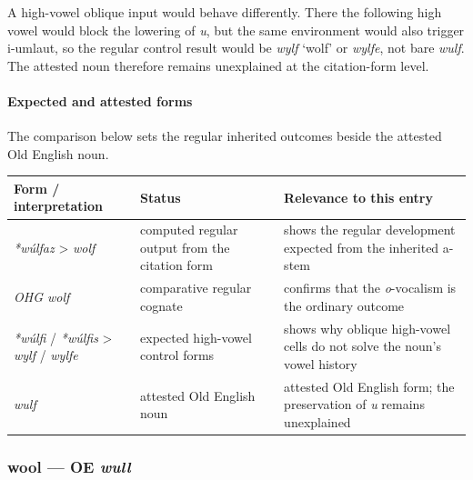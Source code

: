 \documentclass[
  british,
  a4paper,
]{article}
\newcounter{none} %
\begin{document}
A high-vowel oblique input would behave differently. There the following
high vowel would block the lowering of \emph{u}, but the same
environment would also trigger i-umlaut, so the regular control result
would be {\emph{wylf}} `wolf' or \emph{wylfe}, not bare \emph{wulf}. The
attested noun therefore remains unexplained at the citation-form level.

\paragraph{Expected and attested
forms}\label{expected-and-attested-forms-1}

The comparison below sets the regular inherited outcomes beside the
attested Old English noun.

{\def\LTcaptype{none} %
\begin{longtable}[]{@{}
  >{\raggedright\arraybackslash}p{}
  >{\raggedright\arraybackslash}p{}
  >{\raggedright\arraybackslash}p{}@{}}
\toprule\noalign{}
\begin{minipage}[b]{\linewidth}\raggedright
Form / interpretation
\end{minipage} & \begin{minipage}[b]{\linewidth}\raggedright
Status
\end{minipage} & \begin{minipage}[b]{\linewidth}\raggedright
Relevance to this entry
\end{minipage} \\
\midrule\noalign{}
\endhead
\bottomrule\noalign{}
\endlastfoot
\emph{*wúlfaz} \textgreater{} \emph{wolf} & computed regular output from
the citation form & shows the regular development expected from the
inherited a-stem \\
\emph{OHG wolf} & comparative regular cognate & confirms that the
\emph{o}-vocalism is the ordinary outcome \\
\emph{*wúlfi} / \emph{*wúlfis} \textgreater{} \emph{wylf} / \emph{wylfe}
& expected high-vowel control forms & shows why oblique high-vowel cells
do not solve the noun's vowel history \\
\emph{wulf} & attested Old English noun & attested Old English form; the
preservation of \emph{u} remains unexplained \\
\end{longtable}
}

\subsubsection{\texorpdfstring{wool --- OE
\emph{wull}}{wool --- OE wull}}\label{wool-oe-wull}
\end{document}
